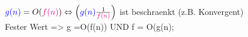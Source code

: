 \newcommand{\graysum}[1]{\sum\textcolor{lightgray}{#1}}

\newcommand{\IN}{\graysum{_{i=1}^n}}
\newcommand{\geo}{\graysum{_{i=0}^n}}
\newcommand{\INzwei}{\sum_{i=2}^n}
\newcommand{\mathitem}[1]{\item$ #1 $}

\newcommand{\gn}{\textcolor{blue}{g(n)}}
\newcommand{\fn}{\textcolor{magenta}{f(n)}}



$\gn = O(\fn) \Leftrightarrow \left(\gn\frac{1}{\fn}\right)$ ist beschraenkt (z.B. Konvergent)\\
Fester Wert => g =O(f(n)) UND f = O(g(n);


\\

